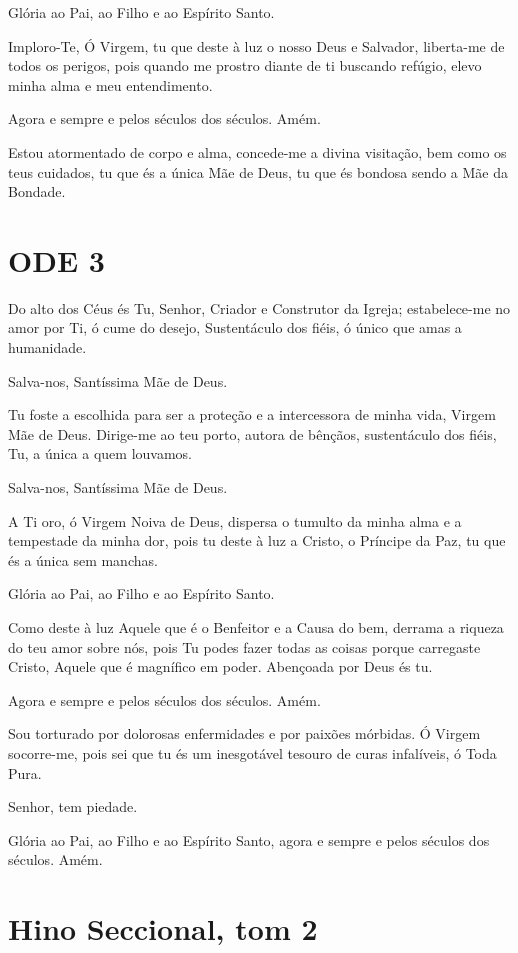 \documentclass{subfiles}
\begin{document}
Glória ao Pai, ao Filho e ao Espírito Santo.

Imploro-Te, Ó Virgem, tu que deste à luz o nosso Deus e Salvador,
liberta-me de todos os perigos, pois quando me prostro diante de ti buscando
refúgio, elevo minha alma e meu entendimento.

Agora e sempre e pelos séculos dos séculos. Amém.

Estou atormentado de corpo e alma, concede-me a divina visitação,
bem como os teus cuidados, tu que és a única Mãe de Deus, tu que és bondosa
sendo a Mãe da Bondade.

\section*{ODE 3}

\eirmos{}Do alto dos Céus és Tu, Senhor, Criador e Construtor da Igreja;
estabelece-me no amor por Ti, ó cume do desejo, Sustentáculo dos fiéis, ó
único que amas a humanidade.

Salva-nos, Santíssima Mãe de Deus.

Tu foste a escolhida para ser a proteção e a intercessora de minha vida,
Virgem Mãe de Deus. Dirige-me ao teu porto, autora de bênçãos, sustentáculo
dos fiéis, Tu, a única a quem louvamos.

Salva-nos, Santíssima Mãe de Deus.

A Ti oro, ó Virgem Noiva de Deus, dispersa o tumulto da minha alma e
a tempestade da minha dor, pois tu deste à luz a Cristo, o Príncipe da Paz, tu
que és a única sem manchas.

Glória ao Pai, ao Filho e ao Espírito Santo.

Como deste à luz Aquele que é o Benfeitor e a Causa do bem, derrama
a riqueza do teu amor sobre nós, pois Tu podes fazer todas as coisas porque
carregaste Cristo, Aquele que é magnífico em poder. Abençoada por Deus és
tu.

Agora e sempre e pelos séculos dos séculos. Amém.

Sou torturado por dolorosas enfermidades e por paixões mórbidas. Ó
Virgem socorre-me, pois sei que tu és um inesgotável tesouro de curas
infalíveis, ó Toda Pura.

Senhor, tem piedade. 

Glória ao Pai, ao Filho e ao Espírito Santo, agora e sempre e pelos
séculos dos séculos. Amém.

\section*{Hino Seccional, tom 2}
\end{document}
